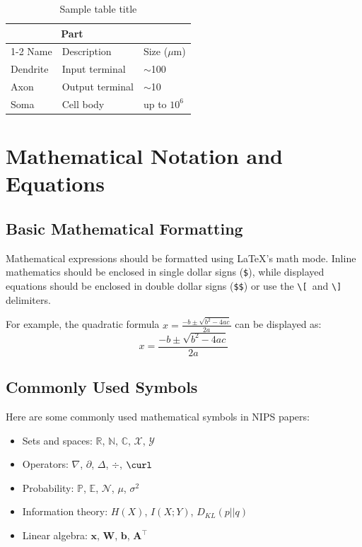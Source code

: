 \documentclass{article}
\begin{document}
\begin{table}
  \caption{Sample table title}
  \label{sample-table}
  \centering
  \begin{tabular}{lll}
    \toprule
    \multicolumn{2}{c}{Part}                   \\
    \cmidrule(r){1-2}
    Name     & Description     & Size ($\mu$m) \\
    \midrule
    Dendrite & Input terminal  & $\sim$100     \\
    Axon     & Output terminal & $\sim$10      \\
    Soma     & Cell body       & up to $10^6$  \\
    \bottomrule
  \end{tabular}
\end{table}

\section{Mathematical Notation and Equations}

\subsection{Basic Mathematical Formatting}

Mathematical expressions should be formatted using \LaTeX{}'s math mode.
Inline mathematics should be enclosed in single dollar signs (\verb+$+),
while displayed equations should be enclosed in double dollar signs
(\verb+$$+) or use the \verb+\[+\ and \verb+\]+ delimiters.

For example, the quadratic formula $x = \frac{-b \pm \sqrt{b^2 - 4ac}}{2a}$
can be displayed as:
\[
x = \frac{-b \pm \sqrt{b^2 - 4ac}}{2a}
\]

\subsection{Commonly Used Symbols}

Here are some commonly used mathematical symbols in NIPS papers:

\begin{itemize}
\item Sets and spaces: $\mathbb{R}$, $\mathbb{N}$, $\mathbb{C}$, $\mathcal{X}$, $\mathcal{Y}$
\item Operators: $\nabla$, $\partial$, $\Delta$, $\div$, $\curl$
\item Probability: $\mathbb{P}$, $\mathbb{E}$, $\mathcal{N}$, $\mu$, $\sigma^2$
\item Information theory: $H(X)$, $I(X;Y)$, $D_{KL}(p||q)$
\item Linear algebra: $\mathbf{x}$, $\mathbf{W}$, $\mathbf{b}$, $\mathbf{A}^\top$
\end{itemize}
\end{document}
